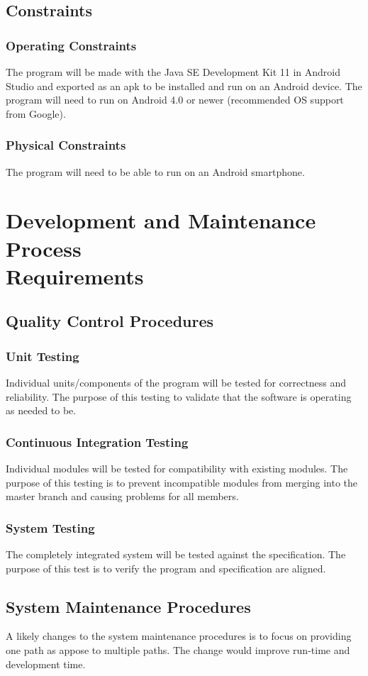 \documentclass[12pt]{article}
\begin{document}
\subsection{Constraints}
    \subsubsection{Operating Constraints}
    The program will be made with the Java SE Development Kit 11 in Android Studio and exported as an apk to be installed and run on an Android device. The program will need to run on Android 4.0 or newer (recommended OS support from Google).
    
    \subsubsection{Physical Constraints}
    The program will need to be able to run on an Android smartphone.

\section{\texorpdfstring{Development and Maintenance Process \\Requirements}{Development and Maintenance Process Requirements}}

\subsection{Quality Control Procedures}
    \subsubsection{Unit Testing}
    Individual units/components of the program will be tested for correctness and reliability. The purpose of this testing to validate that the software is operating as needed to be.
    
    \subsubsection{Continuous Integration Testing}
    Individual modules will be tested for compatibility with existing modules. The purpose of this testing is to prevent incompatible modules from merging into the master branch and causing problems for all members.
    
    \subsubsection{System Testing}
    The completely integrated system will be tested against the specification. The purpose of this test is to verify the program and specification are aligned.

\subsection{System Maintenance Procedures}
A likely changes to the system maintenance procedures is to focus on providing one path as appose to multiple paths. The change would improve run-time and development time.
\end{document}
